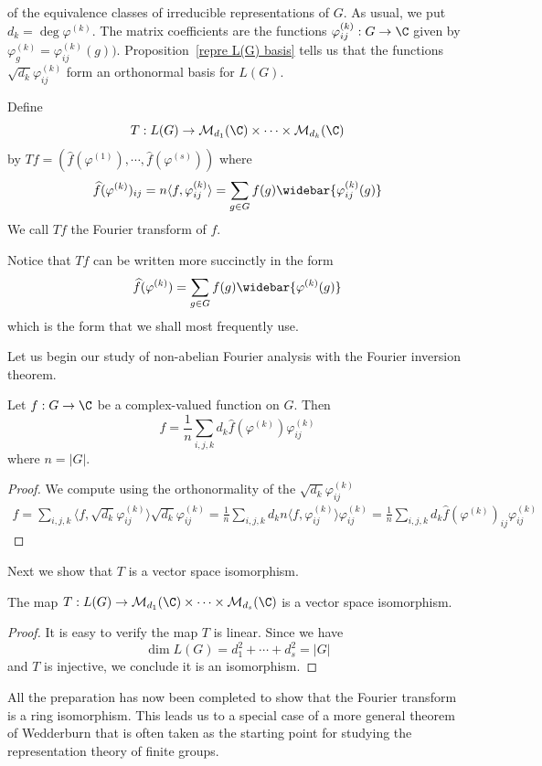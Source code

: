 of the equivalence classes of irreducible representations of $G$. As usual, we put $d_k=\deg\varphi^{(k)}$. The matrix coefficients are the functions $\varphi^{(k)}_{ij}:G\to\C$ given by $\varphi^{(k)}_g=\varphi^{(k)}_{ij}(g))$. Proposition~\ref{repre L(G) basis} tells us that the functions $\sqrt{d_k}\varphi^{(k)}_{ij}$ form an orthonormal basis for $L(G)$.
\begin{definition}
Define
\[T:L(G)\to\mathcal{M}_{d_1}(\C)\times\cdots\times\mathcal{M}_{d_k}(\C)\]
by $Tf=(\widehat{f}(\varphi^{(1)}),\cdots,\widehat{f}(\varphi^{(s)}))$ where
\[\widehat{f}(\varphi^{(k)})_{ij}=n\langle f,\varphi^{(k)}_{ij}\rangle=\sum_{g\in G}f(g)\widebar{\varphi^{(k)}_{ij}(g)}\]
We call $Tf$ the Fourier transform of $f$.
\end{definition}
Notice that $Tf$ can be written more succinctly in the form
\[\widehat{f}(\varphi^{(k)})=\sum_{g\in G}f(g)\widebar{\varphi^{(k)}(g)}\]
which is the form that we shall most frequently use.\par
Let us begin our study of non-abelian Fourier analysis with the Fourier inversion theorem.
\begin{theorem}
Let $f:G\to\C$ be a complex-valued function on $G$. Then
\[f=\frac{1}{n}\sum_{i,j,k}d_k\widehat{f}(\varphi^{(k)})\varphi^{(k)}_{ij}\]
where $n=|G|$.
\end{theorem}
\begin{proof}
We compute using the orthonormality of the $\sqrt{d_k}\varphi^{(k)}_{ij}$
\begin{align*}
f=\sum_{i,j,k}\langle f,\sqrt{d_k}\varphi^{(k)}_{ij}\rangle\sqrt{d_k}\varphi^{(k)}_{ij}=\frac{1}{n}\sum_{i,j,k}d_kn\langle f,\varphi^{(k)}_{ij}\rangle\varphi^{(k)}_{ij}=\frac{1}{n}\sum_{i,j,k}d_k\widehat{f}(\varphi^{(k)})_{ij}\varphi^{(k)}_{ij}
\end{align*}
\end{proof}
Next we show that $T$ is a vector space isomorphism.
\begin{theorem}
The map $T:L(G)\to\mathcal{M}_{d_1}(\C)\times\cdots\times\mathcal{M}_{d_s}(\C)$ is a vector space isomorphism.
\end{theorem}
\begin{proof}
It is easy to verify the map $T$ is linear. Since we have
\[\dim L(G)=d_1^2+\cdots+d_s^2=|G|\]
and $T$ is injective, we conclude it is an isomorphism.
\end{proof}
All the preparation has now been completed to show that the Fourier transform
is a ring isomorphism. This leads us to a special case of a more general theorem of Wedderburn that is often taken as the starting point for studying the representation theory of finite groups.
